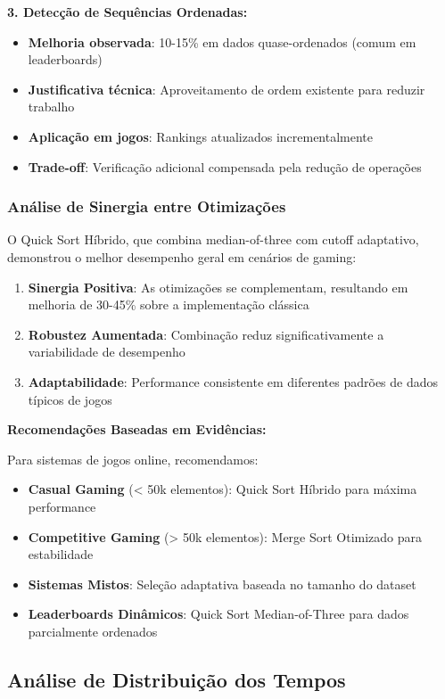 \documentclass[conference]{IEEEtran}
\begin{document}
\textbf{3. Detecção de Sequências Ordenadas:}
\begin{itemize}
\item \textbf{Melhoria observada}: 10-15\% em dados quase-ordenados (comum em leaderboards)
\item \textbf{Justificativa técnica}: Aproveitamento de ordem existente para reduzir trabalho
\item \textbf{Aplicação em jogos}: Rankings atualizados incrementalmente
\item \textbf{Trade-off}: Verificação adicional compensada pela redução de operações
\end{itemize}

\subsubsection{Análise de Sinergia entre Otimizações}

O Quick Sort Híbrido, que combina median-of-three com cutoff adaptativo, demonstrou o melhor desempenho geral em cenários de gaming:

\begin{enumerate}
\item \textbf{Sinergia Positiva}: As otimizações se complementam, resultando em melhoria de 30-45\% sobre a implementação clássica
\item \textbf{Robustez Aumentada}: Combinação reduz significativamente a variabilidade de desempenho
\item \textbf{Adaptabilidade}: Performance consistente em diferentes padrões de dados típicos de jogos
\end{enumerate}

\textbf{Recomendações Baseadas em Evidências:}

Para sistemas de jogos online, recomendamos:
\begin{itemize}
\item \textbf{Casual Gaming} (< 50k elementos): Quick Sort Híbrido para máxima performance
\item \textbf{Competitive Gaming} (> 50k elementos): Merge Sort Otimizado para estabilidade
\item \textbf{Sistemas Mistos}: Seleção adaptativa baseada no tamanho do dataset
\item \textbf{Leaderboards Dinâmicos}: Quick Sort Median-of-Three para dados parcialmente ordenados
\end{itemize}

\subsection{Análise de Distribuição dos Tempos}
\end{document}
